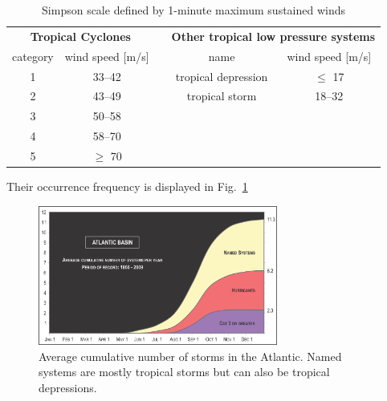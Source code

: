 \begingroup
\setlength{\tabcolsep}{10pt} %
\renewcommand{\arraystretch}{1.5} %
\begin{table}[hbt!]
\centering
\begin{tabular}{|c|c|c|c|c|}
\cline{1-2} \cline{4-5}
\multicolumn{2}{|c|}{\textbf{Tropical Cyclones}} &  & \multicolumn{2}{c|}{\textbf{Other tropical low pressure systems}} \\ \cline{1-2} \cline{4-5} 
category     & wind speed {[}m/s{]}     &  & name                & wind speed {[}m/s{]}               \\ \cline{1-2} \cline{4-5} 
1 & 33--42    &  & tropical depression & $\leq$ 17 \\
2 & 43--49    &  & tropical storm      & 18--32    \\
3 & 50--58    &  &                     &           \\
4 & 58--70    &  &                     &           \\
5 & $\geq$ 70 &  &                     &           \\ \cline{1-2} \cline{4-5} 
\end{tabular}
\caption{Simpson scale defined by 1-minute maximum sustained winds\cite{simpson}}
\label{tab:simpson-scale}
\end{table}
\endgroup

Their occurrence frequency is displayed in Fig.~\ref{fig:cat-climatology} 
\begin{figure}[ht]
\centering
\includegraphics[width=0.7\textwidth]{img/cum-average-cat.png}
\caption{Average cumulative number of storms in the Atlantic. Named systems are mostly tropical storms but can also be tropical depressions.\cite{climatology}}
\label{fig:cat-climatology}
\end{figure}


